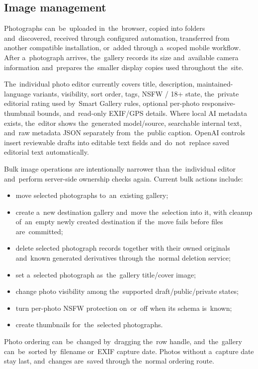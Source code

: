 \documentclass[11pt,a4paper]{article}
\begin{document}
\subsection{Image management}
\label{sec:media}

Photographs can~be~uploaded in~the~browser, copied into folders and~discovered,
received through configured automation, transferred from another compatible
installation, or~added through a~scoped mobile workflow. After a~photograph
arrives, the~gallery records its size and~available camera information
and~prepares the~smaller display copies used throughout the~site.

The~individual photo editor currently covers title, description,
maintained-language variants, visibility, sort order, tags, NSFW / 18+ state,
the~private editorial rating used by~Smart Gallery rules, optional per-photo
responsive-thumbnail bounds, and~read-only EXIF/GPS details. Where local AI
metadata exists, the~editor shows the~generated model/source, searchable
internal text, and~raw metadata JSON separately from~the~public caption. OpenAI
controls insert reviewable drafts into editable text fields and~do~not~replace
saved editorial text automatically.

Bulk image operations are intentionally narrower than the~individual editor
and~perform server-side ownership checks again. Current bulk actions include:

\begin{itemize}
  \item move selected photographs to~an~existing gallery;
  \item create a~new destination gallery and~move the~selection into it, with
  cleanup of~an~empty newly created destination if~the~move fails before files
  are~committed;
  \item delete selected photograph records together with their owned originals
  and~known generated derivatives through the~normal deletion service;
  \item set a~selected photograph as~the~gallery title/cover image;
  \item change photo visibility among the~supported draft/public/private states;
  \item turn per-photo NSFW protection on~or~off when its schema is~known;
  \item create thumbnails for~the~selected photographs.
\end{itemize}

Photo ordering can~be~changed by~dragging the~row handle, and~the~gallery
can~be~sorted by~filename or~EXIF capture date. Photos without a~capture date
stay last, and~changes are~saved through the~normal ordering route.
\end{document}
